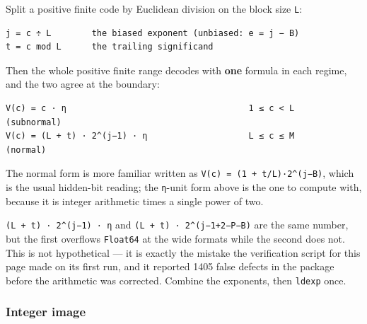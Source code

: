 \label{8694306250686818922}{}


Split a positive finite code by Euclidean division on the block size \texttt{L}:




\nopagebreak[4]
\begin{verbatim}
j = c ÷ L        the biased exponent (unbiased: e = j − B)
t = c mod L      the trailing significand
\end{verbatim}



Then the whole positive finite range decodes with \textbf{one} formula in each regime, and the two agree at the boundary:




\nopagebreak[4]
\begin{verbatim}
V(c) = c · η                                    1 ≤ c < L      (subnormal)
V(c) = (L + t) · 2^(j−1) · η                    L ≤ c ≤ M      (normal)
\end{verbatim}



The normal form is more familiar written as \texttt{V(c) = (1 + t/L)·2{\textasciicircum}(j−B)}, which is the usual hidden-bit reading; the \texttt{η}-unit form above is the one to compute with, because it is integer arithmetic times a single power of two.



\begin{tcolorbox}[toptitle=-1mm,bottomtitle=1mm,colback=admonition-tip!50!white,colframe=admonition-tip,title=\textbf{Compute the exponent once}]
\texttt{(L + t) · 2{\textasciicircum}(j−1) · η} and \texttt{(L + t) · 2{\textasciicircum}(j−1+2−P−B)} are the same number, but the first overflows \texttt{Float64} at the wide formats while the second does not. This is not hypothetical — it is exactly the mistake the verification script for this page made on its first run, and it reported 1405 false {\textquotedbl}defects{\textquotedbl} in the package before the arithmetic was corrected. Combine the exponents, then \texttt{ldexp} once.

\end{tcolorbox}


\subsubsection{Integer image}



\label{14811627372607297590}{}


